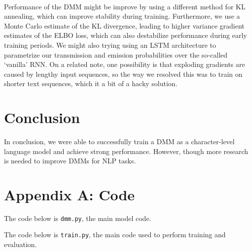\documentclass[justified,nobib]{tufte-handout}
\begin{document}
\begin{fullwidth}
\paragraph{} Performance of the DMM might be improve by using a different method for KL annealing, which can improve stability during training. Furthermore, we use a Monte Carlo estimate of the KL divergence, leading to higher variance gradient estimates of the ELBO loss, which can also destabilize performance during early training periods. We might also trying using an LSTM architecture to parametrize our transmission and emission probabilities over the so-called `vanilla' RNN. On a related note, one possibility is that exploding gradients are caused by lengthy input sequences, so the way we resolved this was to train on shorter text sequences, which it a bit of a hacky solution.
\section{Conclusion}

\paragraph{} In conclusion, we were able to successfully train a DMM as a character-level language model and achieve strong performance. However, though more research is needed to improve DMMs for NLP tasks.

{}

\clearpage
\section{Appendix A: Code}
The code below is \texttt{dmm.py}, the main model code. 

\clearpage
The code below is \texttt{train.py}, the main code used to perform training and evaluation.

\end{fullwidth}
\end{document}
